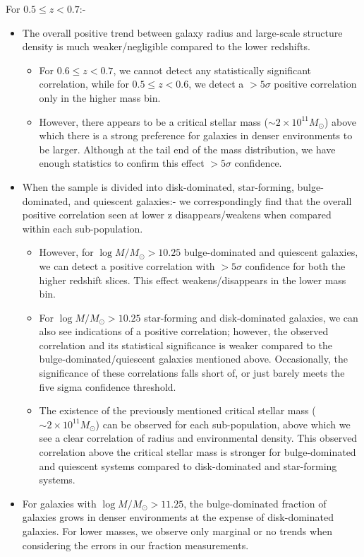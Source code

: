 For $0.5 \leq z < 0.7$:-
\begin{itemize}
    \item The overall positive trend between galaxy radius and large-scale structure density is much weaker/negligible compared to the lower redshifts. 
    \begin{itemize}
        \item For $0.6 \leq z < 0.7$, we cannot detect any statistically significant correlation, while for $0.5 \leq z < 0.6$, we detect a $>5\sigma$ positive correlation only in the higher mass bin.
        \item However, there appears to be a critical stellar mass ($\sim2\times10^{11} M_\odot$) above which there is a strong preference for galaxies in denser environments to be larger. Although at the tail end of the mass distribution, we have enough statistics to confirm this effect $>5\sigma$ confidence. 
    \end{itemize}
    \item When the sample is divided into disk-dominated, star-forming, bulge-dominated, and quiescent galaxies:- we correspondingly find that the overall positive correlation seen at lower z disappears/weakens when compared within each sub-population.
    \begin{itemize}
        \item However, for $\log M/M_{\odot} > 10.25$ bulge-dominated and quiescent galaxies, we can detect a positive correlation with $>5\sigma$ confidence for both the higher redshift slices. This effect weakens/disappears in the lower mass bin. 
        \item For $\log M/M_{\odot} > 10.25$ star-forming and disk-dominated galaxies, we can also see indications of a positive correlation; however, the observed correlation and its statistical significance is weaker compared to the bulge-dominated/quiescent galaxies mentioned above. Occasionally, the significance of these correlations falls short of, or just barely meets the five sigma confidence threshold.
        \item The existence of the previously mentioned critical stellar mass ($\sim2\times10^{11} M_\odot$) can be observed for each sub-population, above which we see a clear correlation of radius and environmental density. This observed correlation above the critical stellar mass is stronger for bulge-dominated and quiescent systems compared to disk-dominated and star-forming systems. 
    \end{itemize}
    \item For galaxies with $\log M/M_\odot > 11.25$,  the bulge-dominated fraction of galaxies grows in denser environments at the expense of disk-dominated galaxies. For lower masses, we observe only marginal or no trends when considering the errors in our fraction measurements.
\end{itemize}

